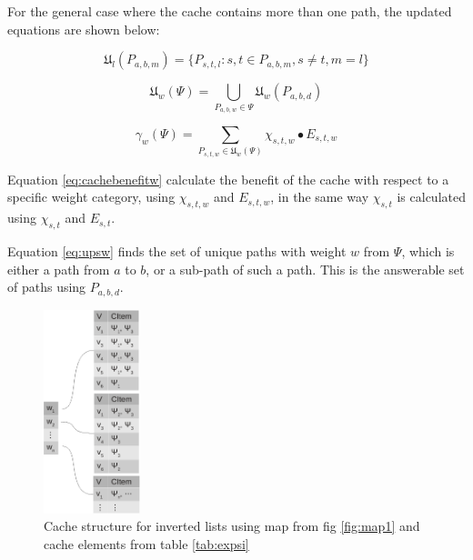 For the general case where the cache contains more than one path, the updated equations are shown below:


\begin{equation} \label{eq:phil}
\mathfrak{U}_l(P_{a,b,m})= \{ P_{s,t,l}: s,t \in P_{a,b,m}, s \neq t, m = l\}
\end{equation}


\begin{equation} \label{eq:upsw}
 \mathfrak{U}_w(\Psi) = \bigcup\limits_{P_{a,b,w} \in \Psi} \mathfrak{U}_w(P_{a,b,d})
\end{equation}

\begin{equation} \label{eq:cachebenefitw}
\gamma_w(\Psi) = \sum\limits_{P_{s,t,w} \in \mathfrak{U}_w(\Psi)} \chi_{s,t,w} \bullet E_{s,t,w}
\end{equation}

Equation \ref{eq:cachebenefitw} calculate the benefit of the cache with respect to a specific weight category, using $\chi_{s,t,w}$ and $E_{s,t,w}$, in the same way $\chi_{s,t}$ is calculated using $\chi_{s,t}$ and $E_{s,t}$.

Equation \ref{eq:upsw} finds the set of unique paths with weight $w$ from $\Psi$, which is either a path from $a$ to $b$, or a sub-path of such a path. This is the answerable set of paths using  $P_{a,b,d}$.




\begin{figure}[hbt]
  \center
        \includegraphics[width=0.25\textwidth]{figures/wilist}
        \caption{Cache structure for inverted lists using map from fig \ref{fig:map1} and cache elements from table \ref{tab:expsi}}
  \label{fig:wilist}
\end{figure}


